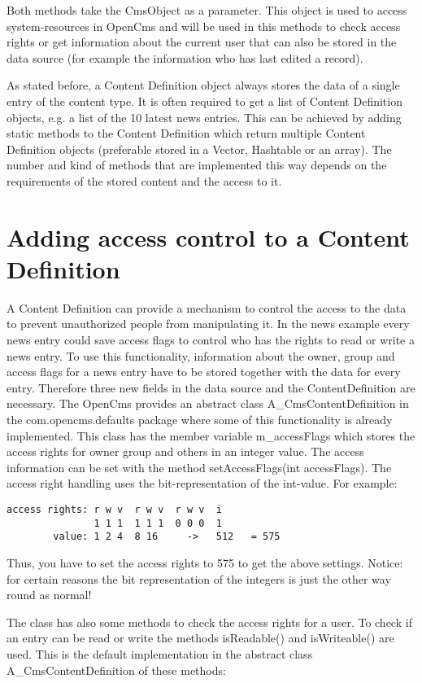 Both methods take the {\class CmsObject} as a parameter. This object 
is used to access system-resources in OpenCms and will be used in this
methods to check access rights or get information about the current user
that can also be stored in the data source (for example the information
who has last edited a record).

As stated before, a Content Definition object always stores the data of
a single entry of the content type. It is often required to get a list
of Content Definition objects, e.g. a list of the 10 latest news
entries. This can be achieved by adding static methods to the
Content Definition which return multiple Content Definition objects
(preferable stored in a Vector, Hashtable or an array).  The number
and kind of methods that are implemented this way depends on the
requirements of the stored content and the access to it.

\section{Adding access control to a Content Definition}
A Content Definition can provide a mechanism to control the access to 
the data to prevent unauthorized people from manipulating it. In the news
example every news entry could save access flags to control who has the
rights to read or write a news entry. To use this functionality, information
about the owner, group and access flags for a news entry have to be stored
together with the data for every entry. Therefore three new fields in the data source
and the ContentDefinition are necessary. The OpenCms
provides an abstract class {\class A\_CmsContentDefinition} in the 
{\code com.opencms.defaults} package where some of this functionality is
already implemented. 
This class has the member variable {\name m\_accessFlags} which stores the access rights
for owner group and others in an integer value. The access information can be set with
the method {\meth setAccessFlags(int accessFlags)}. The access right handling uses the
bit-representation of the int-value. For example:
\begin{verbatim} 
access rights: r w v  r w v  r w v  i 
               1 1 1  1 1 1  0 0 0  1 
        value: 1 2 4  8 16     ->   512   = 575
\end{verbatim}
Thus, you have to set the access rights to 575 to get the above settings.
Notice: for certain reasons the bit representation of the integers is just
the other way round as normal!

The class has also some methods to check the access rights for a user.
To check if an entry can be read or write the methods
{\meth isReadable()} and {\meth isWriteable()} are used. This is the default
implementation in the abstract class {\class A\_CmsContentDefinition} of these 
methods:

